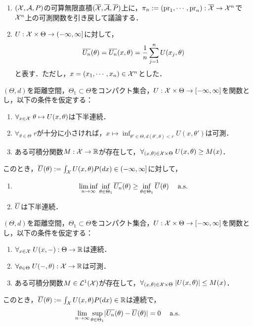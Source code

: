 \documentclass[uplatex,dvipdfmx]{jsreport}
\begin{document}
\begin{notation}\mbox{}
    \begin{enumerate}
        \item $(\mathcal{X},\mathcal{A},P)$の可算無限直積$(\overline{\mathcal{X}},\overline{\mathcal{A}},\overline{P})$上に，$\pi_n:=(\mathrm{pr}_1,\cdots,\mathrm{pr}_n):\overline{\mathcal{X}}\to\mathcal{X}^n$で$\mathcal{X}^n$上の可測関数を引き戻して議論する．
        \item $U:\mathcal{X}\times\Theta\to(-\infty,\infty]$に対して，
        \[\overline{U_n}(\theta)=\overline{U_n}(x,\theta)=\frac{1}{n}\sum^n_{j=1}U(x_j,\theta)\]
        と表す．ただし，$x=(x_1,\cdots,x_n)\in\mathcal{X}^n$とした．
    \end{enumerate}
\end{notation}

\begin{lemma}
    $(\Theta,d)$を距離空間，$\Theta_1\subset\Theta$をコンパクト集合，$U:\mathcal{X}\times\Theta\to[-\infty,\infty]$を関数とし，以下の条件を仮定する：
    \begin{enumerate}[({A}1)]
        \item $\forall_{x\in\mathcal{X}}\;\theta\mapsto U(x,\theta)$は下半連続．
        \item $\forall_{\theta\in\Theta}\;r$が十分に小さければ，$x\mapsto\inf_{\theta'\in\Theta,d(\theta',\theta)<r}U(x,\theta')$は可測．
        \item ある可積分関数$M:\mathcal{X}\to\mathbb{R}$が存在して，$\forall_{(x,\theta)\in\mathcal{X}\times\Theta}\;U(x,\theta)\ge M(x)$．
    \end{enumerate}
    このとき，$\overline{U}(\theta):=\int_{\mathcal{X}} U(x,\theta)P(dx)\in(-\infty,\infty]$に対して，
    \begin{enumerate}
        \item 
        \[\liminf_{n\to\infty}\inf_{\theta\in\Theta_1}\overline{U_n}(\theta)\ge\inf_{\theta\in\Theta_1}\overline{U}(\theta)\quad\;\mathrm{a.s.}\]
        \item $\overline{U}$は下半連続．
    \end{enumerate}
\end{lemma}

\begin{theorem}[一様大数の法則]
    $(\Theta,d)$を距離空間，$\Theta_1\subset\Theta$をコンパクト集合，$U:\mathcal{X}\times\Theta\to[-\infty,\infty]$を関数とし，以下の条件を仮定する：
    \begin{enumerate}[({A}1)]
        \item $\forall_{x\in\mathcal{X}}\;U(x,-):\Theta\to\mathbb{R}$は連続．
        \item $\forall_{\theta\in\Theta}\;U(-,\theta):\mathcal{X}\to\mathbb{R}$は可測．
        \item ある可積分関数$M\in\mathcal{L}^1(\mathcal{X})$が存在して，$\forall_{(x,\theta)\in\mathcal{X}\times\Theta}\;\lvert U(x,\theta)\rvert\le M(x)$．
    \end{enumerate}
    このとき，$\overline{U}(\theta):=\int_{\mathcal{X}} U(x,\theta)P(dx)\in\mathbb{R}$は連続で，
    \[\lim_{n\to\infty}\sup_{\theta\in\Theta_1}\lvert\overline{U_n}(\theta)-\overline{U}(\theta)\rvert=0\quad\;\mathrm{a.s.}\]
\end{theorem}
\end{document}
